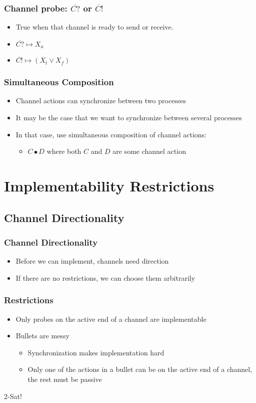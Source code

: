 \documentclass[compress]{beamer}
\begin{document}
\begin{frame}
\frametitle{Channel probe: $\overline{C?}$ or $\overline{C!}$}
\begin{itemize}
\item True when that channel is ready to send or receive.
\item $\overline{C?} \mapsto X_a$
\item $\overline{C!} \mapsto (X_t \lor X_f)$
\end{itemize}
\end{frame}
\begin{frame}
\frametitle{Simultaneous Composition}
\begin{itemize}
\item Channel actions can synchronize between two processes
\item It may be the case that we want to synchronize between several processes
\item In that case, use simultaneous composition of channel actions:
\begin{itemize}
\item $C \bullet D$ where both $C$ and $D$ are some channel action
\end{itemize}
\end{itemize}
\end{frame}
\section{Implementability Restrictions}
\subsection{Channel Directionality}
\begin{frame}
\frametitle{Channel Directionality}
\pause
\begin{itemize}
    \item Before we can implement, channels need direction
    \pause
    \item If there are no restrictions, we can choose them arbitrarily
\end{itemize}
\end{frame}
\begin{frame}
\frametitle{Restrictions}
\pause
\begin{itemize}
    \item Only probes on the active end of a channel are implementable
    \pause
    \item Bullets are messy
    \pause
    \begin{itemize}
        \item Synchronization makes implementation hard
        \pause
        \item Only one of the actions in a bullet can be on the active end of a channel, the rest must be passive
    \end{itemize}
\end{itemize}
\end{frame}
\begin{frame}[plain]
\begin{center}
\huge 2-Sat!
\end{center}
\end{frame}
\end{document}
